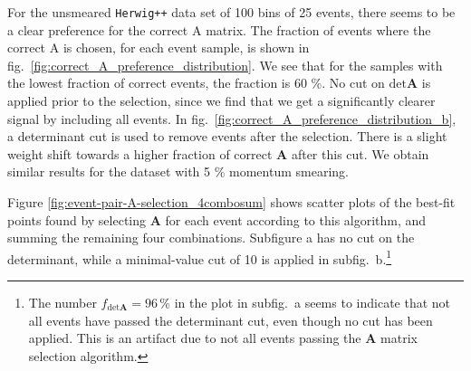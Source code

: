 \documentclass[twoside,english]{uiofysmaster}
\begin{document}
For the unsmeared {\tt Herwig++} data set of 100 bins of 25 events, there seems to be a clear preference for the correct A matrix. The fraction of events where the correct A is chosen, for each event sample, is shown in fig.\ \ref{fig:correct_A_preference_distribution}. We see that for the samples with the lowest fraction of correct events, the fraction is 60 \%. No cut on $\mathrm{det}\mathbf{A}$ is applied prior to the selection, since we find that we get a significantly clearer signal by including all events. In fig.\ \ref{fig:correct_A_preference_distribution_b}, a determinant cut is used to remove events after the selection. There is a slight weight shift towards a higher fraction of correct $\mathbf{A}$ after this cut. We obtain similar results for the dataset with 5 \% momentum smearing.

Figure \ref{fig:event-pair-A-selection_4combosum} shows scatter plots of the best-fit points found by selecting $\mathbf{A}$ for each event according to this algorithm, and summing the remaining four combinations. Subfigure a has no cut on the determinant, while a minimal-value cut of 10 is applied in subfig.\ b.\footnote{The number $f_{\mathrm{det}\mathbf A} = 96\,\%$ in the plot in subfig.\ a seems to indicate that not all events have passed the determinant cut, even though no cut has been applied. This is an artifact due to not all events passing the $\mathbf{A}$ matrix selection algorithm.}
\end{document}
